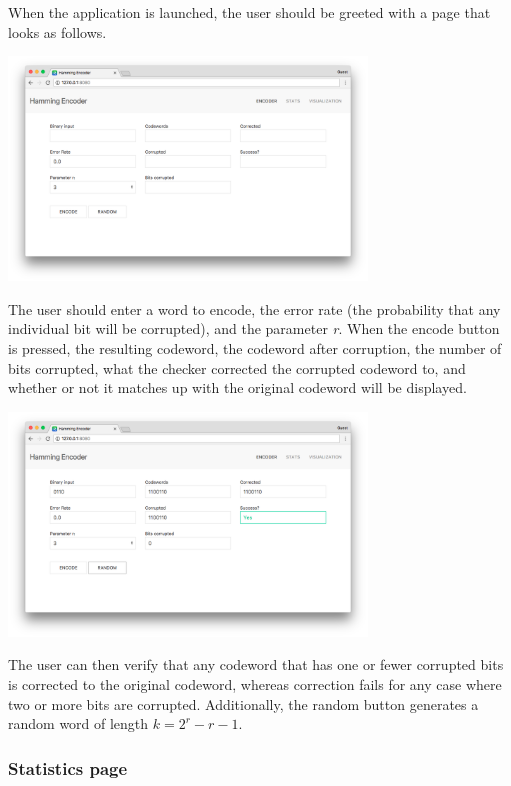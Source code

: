 \documentclass[11pt, oneside]{article}   	%
\begin{document}
When the application is launched, the user should be greeted with a page that looks as follows.

\begin{center}
\includegraphics[width=360px]{main_blank}
\end{center}

The user should enter a word to encode, the error rate (the probability that any individual bit will be corrupted), and the parameter \textit{r}. When the encode button is pressed, the resulting codeword, the codeword after corruption, the number of bits corrupted, what the checker corrected the corrupted codeword to, and whether or not it matches up with the original codeword will be displayed. 

\begin{center}
\includegraphics[width=360px]{main_code}
\end{center}

The user can then verify that any codeword that has one or fewer corrupted bits is corrected to the original codeword, whereas correction fails for any case where two or more bits are corrupted. Additionally, the random button generates a random word of length $k = 2^r - r - 1$. 

\subsubsection*{Statistics page}
\end{document}
